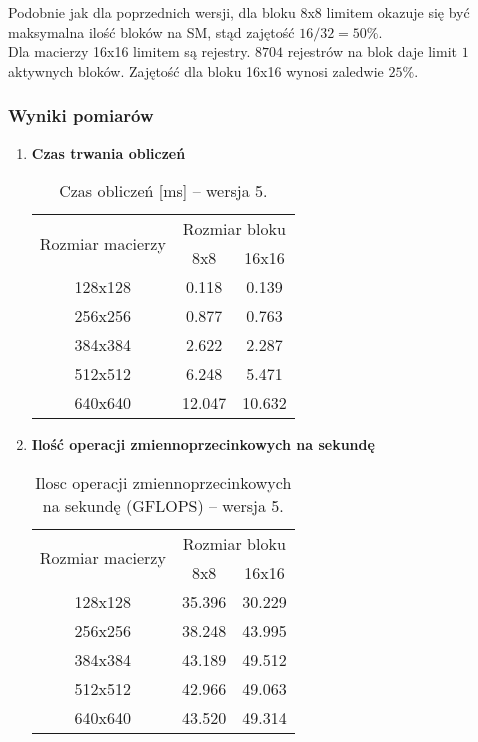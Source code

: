 Podobnie jak dla poprzednich wersji, dla bloku 8x8 limitem okazuje się być maksymalna ilość bloków na SM, stąd zajętość $ 16 / 32 = 50\% $. \\
Dla macierzy 16x16 limitem są rejestry. $8704$ rejestrów na blok daje limit $1$ aktywnych bloków. Zajętość dla bloku 16x16 wynosi zaledwie $ 25\% $. \\

\subsubsection{Wyniki pomiarów}

\begin{enumerate}

\item \textbf{Czas trwania obliczeń} \newline

\begin{table}[H]
\centering
\begin{tabular}{|c|c|c|}
\hline
\multirow{2}{*}{Rozmiar macierzy} & \multicolumn{2}{c|}{Rozmiar bloku} \\ \cline{2-3}
& 8x8 & 16x16 \\ \hline
128x128 & 0.118 & 0.139 \\ \hline
256x256 & 0.877 & 0.763 \\ \hline
384x384 & 2.622 & 2.287 \\ \hline
512x512 & 6.248 & 5.471 \\ \hline
640x640 & 12.047 & 10.632 \\ \hline
\end{tabular}
\caption{Czas obliczeń [ms] -- wersja 5.}
\end{table}

\item \textbf{Ilość operacji zmiennoprzecinkowych na sekundę} \newline

\begin{table}[H]
\centering
\begin{tabular}{|c|c|c|}
\hline
\multirow{2}{*}{Rozmiar macierzy} & \multicolumn{2}{c|}{Rozmiar bloku} \\ \cline{2-3}
& 8x8 & 16x16 \\ \hline
128x128 & 35.396 & 30.229 \\ \hline
256x256 & 38.248 & 43.995 \\ \hline
384x384 & 43.189 & 49.512 \\ \hline
512x512 & 42.966 & 49.063 \\ \hline
640x640 & 43.520 & 49.314 \\ \hline
\end{tabular}
\caption{Ilosc operacji zmiennoprzecinkowych na sekundę (GFLOPS) -- wersja 5.}
\end{table}


\end{enumerate}
